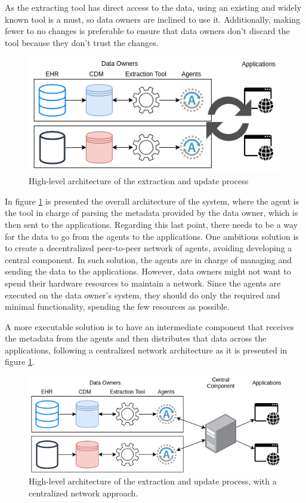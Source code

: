 As the extracting tool has direct access to the data, using an existing and widely known tool is a must, so data owners are inclined to use it.
Additionally, making fewer to no changes is preferable to ensure that data owners don't discard the tool because they don't trust the changes.

\begin{figure}[h]
    \center
    \includegraphics[width=.6\textwidth]{overall-arch-v2}
    \caption{High-level architecture of the extraction and update process}
    \label{fig:overall-arch-v2}
\end{figure}

In figure \ref{fig:overall-arch-v2} is presented the overall architecture of the system, where the agent is the tool in charge of parsing the metadata provided by the data owner, which is then sent to the applications.
Regarding this last point, there needs to be a way for the data to go from the agents to the applications.
One ambitious solution is to create a decentralized peer-to-peer network of agents, avoiding developing a central component.
In such solution, the agents are in charge of managing and sending the data to the applications.
However, data owners might not want to spend their hardware resources to maintain a network.
Since the agents are executed on the data owner's system, they should do only the required and minimal functionality, spending the few resources as possible.

A more executable solution is to have an intermediate component that receives the metadata from the agents and then distributes that data across the applications, following a centralized network architecture as it is presented in figure \ref{fig:overall-arch-v2}.

\begin{figure}[h]
    \center
    \includegraphics[width=.6\textwidth]{overall-arch-v3}
    \caption{High-level architecture of the extraction and update process, with a centralized network approach.}
    \label{fig:overall-arch-v3}
\end{figure}

